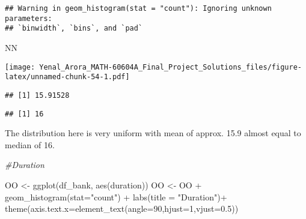 \documentclass[
]{article}
\newenvironment{Shaded}{\begin{snugshade}}{\end{snugshade}}
\newcommand{\AttributeTok}[1]{\textcolor[rgb]{0.77,0.63,0.00}{#1}}
\newcommand{\CommentTok}[1]{\textcolor[rgb]{0.56,0.35,0.01}{\textit{#1}}}
\newcommand{\DecValTok}[1]{\textcolor[rgb]{0.00,0.00,0.81}{#1}}
\newcommand{\FloatTok}[1]{\textcolor[rgb]{0.00,0.00,0.81}{#1}}
\newcommand{\FunctionTok}[1]{\textcolor[rgb]{0.00,0.00,0.00}{#1}}
\newcommand{\NormalTok}[1]{#1}
\newcommand{\OtherTok}[1]{\textcolor[rgb]{0.56,0.35,0.01}{#1}}
\newcommand{\SpecialCharTok}[1]{\textcolor[rgb]{0.00,0.00,0.00}{#1}}
\newcommand{\StringTok}[1]{\textcolor[rgb]{0.31,0.60,0.02}{#1}}
\begin{document}
\begin{verbatim}
## Warning in geom_histogram(stat = "count"): Ignoring unknown parameters:
## `binwidth`, `bins`, and `pad`
\end{verbatim}

\begin{Shaded}
\begin{Highlighting}[]
\NormalTok{NN}
\end{Highlighting}
\end{Shaded}

\texttt{[image: Yenal\_Arora\_MATH-60604A\_Final\_Project\_Solutions\_files/figure-latex/unnamed-chunk-54-1.pdf]}

\begin{Shaded}
\end{Shaded}

\begin{verbatim}
## [1] 15.91528
\end{verbatim}

\begin{Shaded}
\end{Shaded}

\begin{verbatim}
## [1] 16
\end{verbatim}

The distribution here is very uniform with mean of approx. 15.9 almost
equal to median of 16.

\begin{Shaded}
\begin{Highlighting}[]
\CommentTok{\#Duration}

\NormalTok{OO }\OtherTok{\textless{}{-}} \FunctionTok{ggplot}\NormalTok{(df\_bank, }\FunctionTok{aes}\NormalTok{(duration))}
\NormalTok{OO }\OtherTok{\textless{}{-}}\NormalTok{ OO }\SpecialCharTok{+} \FunctionTok{geom\_histogram}\NormalTok{(}\AttributeTok{stat=}\StringTok{"count"}\NormalTok{) }\SpecialCharTok{+} \FunctionTok{labs}\NormalTok{(}\AttributeTok{title =} \StringTok{"Duration"}\NormalTok{)}\SpecialCharTok{+}
  \FunctionTok{theme}\NormalTok{(}\AttributeTok{axis.text.x=}\FunctionTok{element\_text}\NormalTok{(}\AttributeTok{angle=}\DecValTok{90}\NormalTok{,}\AttributeTok{hjust=}\DecValTok{1}\NormalTok{,}\AttributeTok{vjust=}\FloatTok{0.5}\NormalTok{))}
\end{Highlighting}
\end{Shaded}
\end{document}

